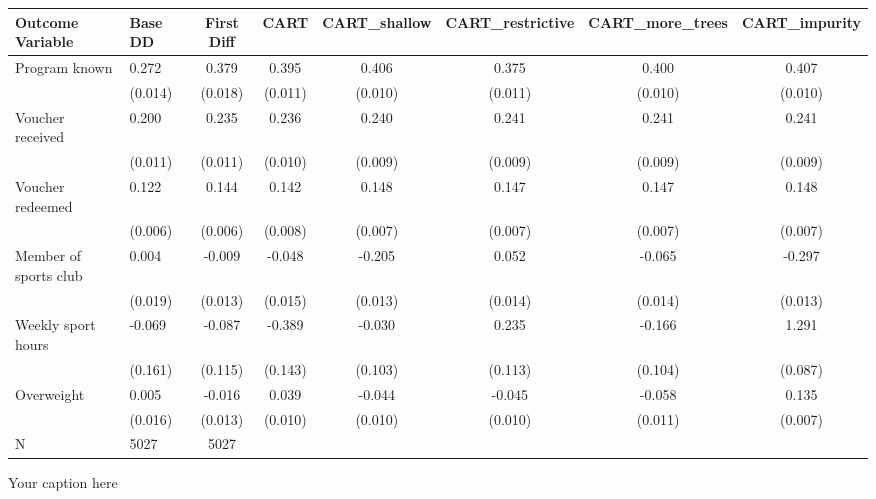 \begin{adjustbox}{angle=90}
\begin{tabular}{llcccccc}
\hline
Outcome Variable & Base DD & First Diff & CART & CART_shallow & CART_restrictive & CART_more_trees & CART_impurity \\
\hline
Program known & 0.272 & 0.379 & 0.395 & 0.406 & 0.375 & 0.400 & 0.407 \\
  & (0.014) & (0.018) & (0.011) & (0.010) & (0.011) & (0.010) & (0.010) \\
Voucher received & 0.200 & 0.235 & 0.236 & 0.240 & 0.241 & 0.241 & 0.241 \\
  & (0.011) & (0.011) & (0.010) & (0.009) & (0.009) & (0.009) & (0.009) \\
Voucher redeemed & 0.122 & 0.144 & 0.142 & 0.148 & 0.147 & 0.147 & 0.148 \\
  & (0.006) & (0.006) & (0.008) & (0.007) & (0.007) & (0.007) & (0.007) \\
Member of sports club & 0.004 & -0.009 & -0.048 & -0.205 & 0.052 & -0.065 & -0.297 \\
  & (0.019) & (0.013) & (0.015) & (0.013) & (0.014) & (0.014) & (0.013) \\
Weekly sport hours & -0.069 & -0.087 & -0.389 & -0.030 & 0.235 & -0.166 & 1.291 \\
  & (0.161) & (0.115) & (0.143) & (0.103) & (0.113) & (0.104) & (0.087) \\
Overweight & 0.005 & -0.016 & 0.039 & -0.044 & -0.045 & -0.058 & 0.135 \\
  & (0.016) & (0.013) & (0.010) & (0.010) & (0.010) & (0.011) & (0.007) \\
\hline
N & 5027 & 5027  &  &  &  &  \\
\hline
\end{tabular}
\caption{Your caption here}
\label{tab:your_label}
\end{adjustbox}